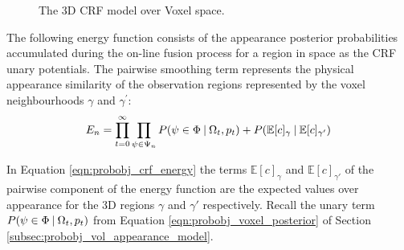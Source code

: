\begin{figure}[h]
{
  }
  \caption[3D CRF over Voxels]
  {The 3D CRF model over Voxel space.}
\end{figure}

The following energy function consists of the appearance posterior probabilities
accumulated during the on-line fusion process for a region in space as the
CRF unary potentials. The pairwise smoothing term represents the physical
appearance similarity of the observation regions represented by the
voxel neighbourhoods $\gamma$ and $\gamma^{'}$:
\begin{equation}
  \label{eqn:probobj_crf_energy}
  E_{n} = \prod_{t=0}^{\infty} \prod_{\psi \in \Psi_{n}}
  P(\psi \in \Phi \:\vert\: \Omega_{t}, p_{t}) +
  P(\mathbb{E}[c]_{\gamma} \:\vert\: \mathbb{E}[c]_{\gamma'})
\end{equation}

In Equation \ref{eqn:probobj_crf_energy} the terms $\mathbb{E}[c]_{\gamma}$ and
$\mathbb{E}[c]_{\gamma'}$ of the pairwise component of the energy function are
the expected values over appearance for the 3D regions $\gamma$ and $\gamma'$
respectively. Recall the unary term $P(\psi \in \Phi \:\vert\: \Omega_{t}, p_{t})$
from Equation \ref{eqn:probobj_voxel_posterior} of Section
\ref{subsec:probobj_vol_appearance_model}.

